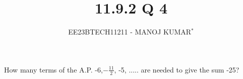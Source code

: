 \documentclass[journal,12pt,twocolumn]{IEEEtran}
\theoremstyle{remark}
\begin{document}

\vspace{3cm}

\title{11.9.2 Q 4}
\author{EE23BTECH11211 - MANOJ KUMAR$^{*}$%
}
\maketitle
\newpage
\bigskip

\renewcommand{\thefigure}{\theenumi}
\renewcommand{\thetable}{\theenumi}



How many terms of the A.P. -6,$-\frac{11}{2}$, -5, ..... are needed to give the sum -25?\\

\solution\\


\end{document}
